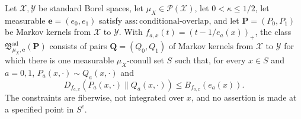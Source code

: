 Let \(\mathcal X,\mathcal Y\) be standard Borel spaces, let \(\mu_X\in\mathcal P(\mathcal X)\), let \(0<\kappa\le1/2\), let measurable \(\boldsymbol e=(e_0,e_1)\) satisfy \(\mathrm{ass:conditional\text{-}overlap}\), and let \(\boldsymbol P=(P_0,P_1)\) be Markov kernels from \(\mathcal X\) to \(\mathcal Y\).  With \(f_{a,x}(t)=(t-1/e_a(x))_+\), the class \(\mathfrak B^{\mathrm{ad}}_{\mu_X,\boldsymbol e}(\boldsymbol P)\) consists of pairs \(\boldsymbol Q=(Q_0,Q_1)\) of Markov kernels from \(\mathcal X\) to \(\mathcal Y\) for which there is one measurable \(\mu_X\)-conull set \(S\) such that, for every \(x\in S\) and \(a=0,1\), \(P_a(x,\cdot)\sim Q_a(x,\cdot)\) and
\[
 D_{f_{a,x}}(P_a(x,\cdot)\|Q_a(x,\cdot))\le B_{f_{a,x}}(e_a(x)).
\]
The constraints are fiberwise, not integrated over \(x\), and no assertion is made at a specified point in \(S^c\).
